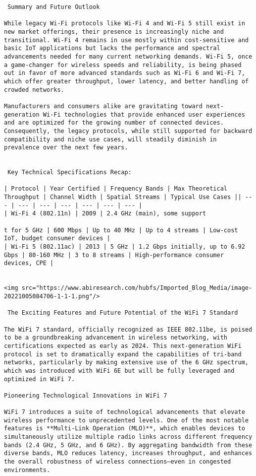 \begin{verbatim}
 Summary and Future Outlook

While legacy Wi-Fi protocols like Wi-Fi 4 and Wi-Fi 5 still exist in new market offerings, their presence is increasingly niche and transitional. Wi-Fi 4 remains in use mostly within cost-sensitive and basic IoT applications but lacks the performance and spectral advancements needed for many current networking demands. Wi-Fi 5, once a game-changer for wireless speeds and reliability, is being phased out in favor of more advanced standards such as Wi-Fi 6 and Wi-Fi 7, which offer greater throughput, lower latency, and better handling of crowded networks.

Manufacturers and consumers alike are gravitating toward next-generation Wi-Fi technologies that provide enhanced user experiences and are optimized for the growing number of connected devices. Consequently, the legacy protocols, while still supported for backward compatibility and niche use cases, will steadily diminish in prevalence over the next few years.


 Key Technical Specifications Recap:

| Protocol | Year Certified | Frequency Bands | Max Theoretical Throughput | Channel Width | Spatial Streams | Typical Use Cases || --- | --- | --- | --- | --- | --- | --- |
| Wi-Fi 4 (802.11n) | 2009 | 2.4 GHz (main), some support

t for 5 GHz | 600 Mbps | Up to 40 MHz | Up to 4 streams | Low-cost IoT, budget consumer devices |
| Wi-Fi 5 (802.11ac) | 2013 | 5 GHz | 1.2 Gbps initially, up to 6.92 Gbps | 80-160 MHz | 3 to 8 streams | High-performance consumer devices, CPE |


<img src="https://www.abiresearch.com/hubfs/Imported_Blog_Media/image-20221005084706-1-1-1.png"/>

 The Exciting Features and Future Potential of the WiFi 7 Standard

The WiFi 7 standard, officially recognized as IEEE 802.11be, is poised to be a groundbreaking advancement in wireless networking, with certifications expected as early as 2024. This next-generation WiFi protocol is set to dramatically expand the capabilities of tri-band networks, particularly by making extensive use of the 6 GHz spectrum, which was introduced with WiFi 6E but will be fully leveraged and optimized in WiFi 7.

Pioneering Technological Innovations in WiFi 7

WiFi 7 introduces a suite of technological advancements that elevate wireless performance to unprecedented levels. One of the most notable features is **Multi-Link Operation (MLO)**, which enables devices to simultaneously utilize multiple radio links across different frequency bands (2.4 GHz, 5 GHz, and 6 GHz). By aggregating bandwidth from these diverse bands, MLO reduces latency, increases throughput, and enhances the overall robustness of wireless connections—even in congested environments.


\end{verbatim}
